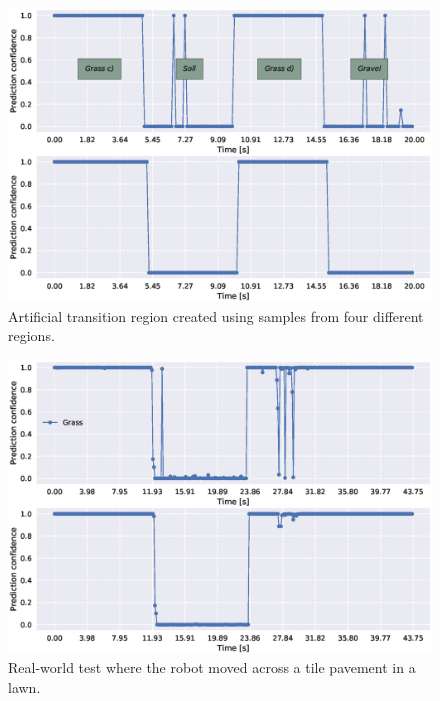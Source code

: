 \begin{figure}
	\centering
	\includegraphics[scale=0.5]{figs_temp/varmats2}
	\caption{Artificial transition region created using samples from four different regions.}
\end{figure}

\begin{figure}
	\centering
	\includegraphics[scale=0.5]{figs_temp/transition_grass_tiles_grass}
	\caption{Real-world test where the robot moved across a tile pavement in a lawn.} 
\end{figure}

